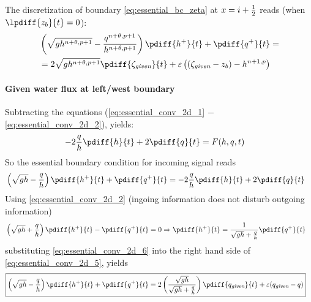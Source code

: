 The discretization of  boundary \autoref{eq:essential_bc_zeta} at $x=i+\frac{1}{2}$ reads (when $\lpdiff{z_b}{t}=0$):
\begin{align}
    &\left(\sqrt{gh^{n+\theta,p+1}} - \frac{q^{n+\theta,p+1}}{h^{n+\theta,p+1}}\right) \pdiff{h^{+}}{t} + \pdiff{q^{+}}{t}  =
    \nonumber \\*
    & = 2 \sqrt{gh^{n+\theta,p+1}} \pdiff{\zeta_{\textit{given}}}{t}
    + \eps \left( (\zeta_{\textit{given}} -z_b) - h^{n+1,p}   \right)
\end{align}
\paragraph*{Given water flux at left/west boundary}
Subtracting the equations (\eqref{eq:essential_conv_2d_1} $-$ \eqref{eq:essential_conv_2d_2}), yields:
\begin{align}
    - 2 \frac{q}{h}\pdiff{h}{t}  + 2 \pdiff{q}{t} & =  F(h, q, t)
\end{align}
So the essential boundary condition for incoming signal reads
\begin{align}
    & \left(\sqrt{gh} - \frac{q}{h}\right) \pdiff{h^{+}}{t} + \pdiff{q^{+}}{t} =
    - 2 \frac{q}{h}\pdiff{h}{t}  + 2 \pdiff{q}{t} \label{eq:essential_conv_2d_5}
\end{align}
Using \autoref{eq:essential_conv_2d_2} (ingoing information does not disturb outgoing information)
\begin{align}
    &\left(\sqrt{gh} + \frac{q}{h}\right) \pdiff{h^{+}}{t} - \pdiff{q^{+}}{t} = 0
    \Rightarrow
    \pdiff{h^{+}}{t}   =
    \frac{1}{\sqrt{gh} + \frac{q}{h}}\pdiff{q^{+}}{t}\label{eq:essential_conv_2d_6}
\end{align}
substituting \autoref{eq:essential_conv_2d_6} into the right hand side of \autoref{eq:essential_conv_2d_5}, yields
\begin{align}
    &{\boxed{
            \left(\sqrt{gh} - \frac{q}{h}\right) \pdiff{h^{+}}{t} + \pdiff{q^{+}}{t} =
            2 \left( \frac{\sqrt{gh}}{\sqrt{gh} + \frac{q}{h}} \right)\pdiff{q_{\textit{given}}}{t} + \eps(q_{\textit{given}} - q)
    }}\label{eq:essential_bc_2d_q}
\end{align}

